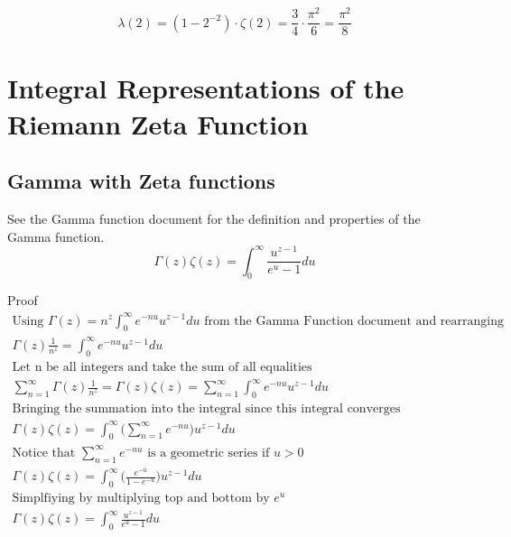 \documentclass[a4paper]{article}
\begin{document}
\begin{equation} 
\lambda(2) = (1 - 2^{-2}) \cdot \zeta(2) =
\frac{3}{4} \cdot \frac{\pi^2}{6} = \frac{\pi^2}{8} 
\end{equation}

\pagebreak

\section{Integral Representations of the Riemann Zeta Function}\label{zf:sec:integral-forms}
\subsection{Gamma with Zeta functions}
\begin{theorem}
See the Gamma function document for the definition and properties of the Gamma function.
\begin{equation}
\boxed{
\Gamma(z) \zeta(z) = \int_{0}^{\infty} \frac{u^{z-1}}{e^{u} - 1} du}
\end{equation}

Proof
\\
\begin{gather*}
\text{Using $\Gamma(z) = n^z  \int_{0}^{\infty} e^{-n u} u^{z-1} du$ from the Gamma Function document and rearranging}
\\
\Gamma(z) \frac{1}{n^z} =  \int_{0}^{\infty} e^{-n u} u^{z-1} du
\\
\text{Let n be all integers and take the sum of all equalities}
\\
\sum_{n=1}^{\infty} \Gamma(z) \frac{1}{n^z} 
=
\Gamma(z) \zeta(z)
= 
\sum_{n=1}^{\infty} \int_{0}^{\infty} e^{-n u} u^{z-1} du
\\
\text{Bringing the summation into the integral since this integral converges uniformly}
\\
\Gamma(z) \zeta(z) =  \int_{0}^{\infty} \Big( \sum_{n=1}^{\infty} e^{-n u} \Big) u^{z-1} du
\\
\text{Notice that $\sum_{n=1}^{\infty} e^{-n u}$ is a geometric series if $u>0$}
\\
\Gamma(z) \zeta(z) =  \int_{0}^{\infty} \Big(\frac{e^{-u}}{1-e^{-u}} \Big) u^{z-1} du
\\
\text{Simplfiying by multiplying top and bottom by $e^u$}
\\
\Gamma(z) \zeta(z) =  \int_{0}^{\infty} \frac{u^{z-1}}{e^u -1} du
\end{gather*}
\end{theorem}
\end{document}
